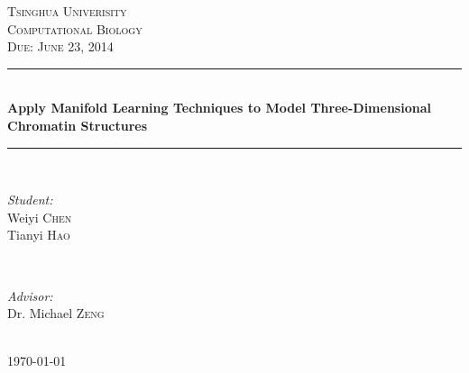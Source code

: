 \documentclass[12pt]{article} %
\begin{document}

\begin{titlepage}

\newcommand{\HRule}{\rule{\linewidth}{0.5mm}} %

\center %

\textsc{\LARGE Tsinghua Univerisity}\\[1.5cm] %
\textsc{\Large Computational Biology}\\[0.5cm] %
\textsc{\large Due: June 23, 2014}\\[0.5cm] %

\HRule \\[0.4cm]
{ \huge \bfseries Apply Manifold Learning Techniques to Model Three-Dimensional Chromatin Structures}\\[0.4cm] %
\HRule \\[1.5cm]

\begin{minipage}{0.4\textwidth}
\begin{flushleft} \large
\emph{Student:}\\
Weiyi \textsc{Chen}  \\
Tianyi \textsc{Hao}%
\end{flushleft}
\end{minipage}
~
\begin{minipage}{0.4\textwidth}
\begin{flushright} \large
\emph{Advisor:} \\
Dr. Michael \textsc{Zeng} %
\end{flushright}
\end{minipage}\\[4cm]

{\large \today}\\[3cm] %


\vfill %

\end{titlepage}
\end{document}
